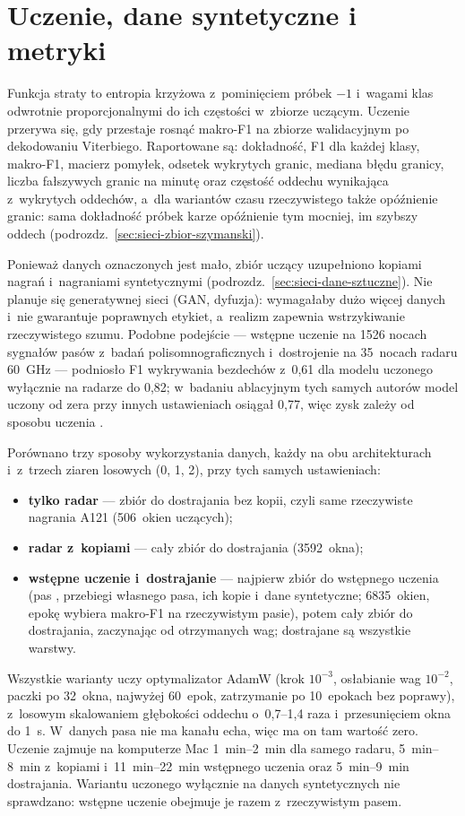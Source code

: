 \documentclass[12pt,a4paper,oneside]{report}
\begin{document}
\section{Uczenie, dane syntetyczne i metryki}
\label{sec:sieci-uczenie}

Funkcja straty to entropia krzyżowa z~pominięciem próbek $-1$ i~wagami klas
odwrotnie proporcjonalnymi do ich częstości w~zbiorze uczącym. Uczenie
przerywa się, gdy przestaje rosnąć makro-F1 na zbiorze walidacyjnym po
dekodowaniu Viterbiego. Raportowane są: dokładność, F1 dla każdej klasy,
makro-F1, macierz pomyłek, odsetek wykrytych granic, mediana błędu granicy,
liczba fałszywych granic na minutę oraz częstość oddechu wynikająca
z~wykrytych oddechów, a~dla wariantów czasu rzeczywistego także opóźnienie
granic: sama dokładność próbek karze opóźnienie tym mocniej, im szybszy
oddech (podrozdz.~\ref{sec:sieci-zbior-szymanski}).

Ponieważ danych oznaczonych jest mało, zbiór uczący uzupełniono kopiami
nagrań i~nagraniami syntetycznymi (podrozdz.~\ref{sec:sieci-dane-sztuczne}).
Nie planuje się
generatywnej sieci (GAN, dyfuzja): wymagałaby dużo więcej danych i~nie
gwarantuje poprawnych etykiet, a~realizm zapewnia wstrzykiwanie rzeczywistego
szumu. Podobne podejście --- wstępne uczenie na 1526 nocach sygnałów pasów
z~badań polisomnograficznych i~dostrojenie na 35~nocach radaru \SI{60}{GHz}
--- podniosło F1 wykrywania bezdechów z~0,61 dla modelu uczonego wyłącznie na
radarze do 0,82; w~badaniu ablacyjnym tych samych autorów model uczony od
zera przy innych ustawieniach osiągał 0,77, więc zysk zależy od sposobu
uczenia \cite{lu2026}.

Porównano trzy sposoby wykorzystania danych, każdy na obu architekturach i~z~trzech
ziaren losowych (0, 1, 2), przy tych samych ustawieniach:
\begin{itemize}
  \item \textbf{tylko radar} --- zbiór do dostrajania bez kopii, czyli same
  rzeczywiste nagrania A121 (506~okien uczących);
  \item \textbf{radar z~kopiami} --- cały zbiór do dostrajania (3592~okna);
  \item \textbf{wstępne uczenie i~dostrajanie} --- najpierw zbiór do wstępnego uczenia
  (pas \cite{szymanski2025}, przebiegi własnego pasa, ich kopie i~dane syntetyczne;
  6835~okien, epokę wybiera makro-F1 na rzeczywistym pasie), potem cały zbiór do
  dostrajania, zaczynając od otrzymanych wag; dostrajane są wszystkie warstwy.
\end{itemize}
Wszystkie warianty uczy optymalizator AdamW (krok $10^{-3}$, osłabianie wag $10^{-2}$,
paczki po 32~okna, najwyżej 60~epok, zatrzymanie po 10~epokach bez poprawy), z~losowym
skalowaniem głębokości oddechu o~0,7--1,4 raza i~przesunięciem okna do \SI{1}{s}. W~danych
pasa nie ma kanału echa, więc ma on tam wartość zero. Uczenie zajmuje na komputerze Mac
\SIrange{1}{2}{min} dla samego radaru, \SIrange{5}{8}{min} z~kopiami i~\SIrange{11}{22}{min}
wstępnego uczenia oraz \SIrange{5}{9}{min} dostrajania. Wariantu uczonego wyłącznie na danych
syntetycznych nie sprawdzano: wstępne uczenie obejmuje je razem z~rzeczywistym pasem.
\end{document}
